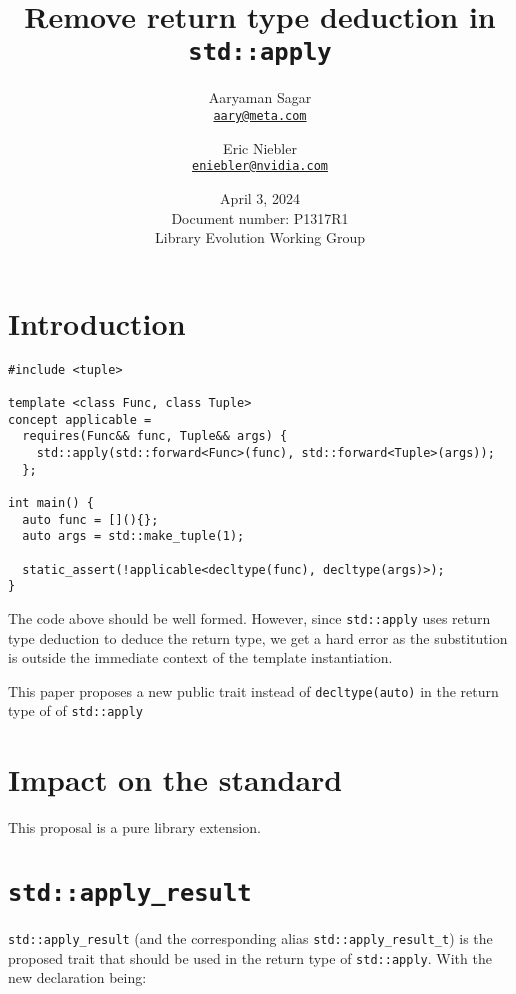\documentclass{article}
\begin{document}
\title{\textbf{Remove return type deduction in \texttt{std::apply}}}
\author{
  Aaryaman Sagar\\
  \href{mailto:aary@meta.com}{\texttt{aary@meta.com}}
  \and
  Eric Niebler\\
  \href{mailto:eniebler@nvidia.com}{\texttt{eniebler@nvidia.com}}
}
\date{April 3, 2024 \\ Document number: P1317R1 \\ Library Evolution Working Group}
\maketitle

\section{Introduction}

\begin{lstlisting}
#include <tuple>

template <class Func, class Tuple>
concept applicable =
  requires(Func&& func, Tuple&& args) {
    std::apply(std::forward<Func>(func), std::forward<Tuple>(args));
  };

int main() {
  auto func = [](){};
  auto args = std::make_tuple(1);

  static_assert(!applicable<decltype(func), decltype(args)>);
}
\end{lstlisting}

The code above should be well formed.  However, since \texttt{std::apply} uses
return type deduction to deduce the return type, we get a hard error as the
substitution is outside the immediate context of the template instantiation.

This paper proposes a new public trait instead of \texttt{decltype(auto)} in
the return type of of \texttt{std::apply}

\section{Impact on the standard}
This proposal is a pure library extension.

\section{\texttt{std::apply\_result}}
\texttt{std::apply\_result} (and the corresponding alias
\texttt{std::apply\_result\_t}) is the proposed trait that should be used in
the return type of \texttt{std::apply}.  With the new declaration being:
\end{document}

